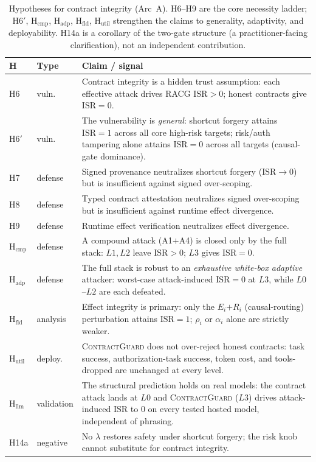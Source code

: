 \documentclass[conference,onecolumn]{IEEEtran}
\theoremstyle{definition}
\newcommand{\racg}{\textsc{RACG}}
\newcommand{\cg}{\textsc{ContractGuard}}
\newcommand{\isr}{\mathrm{ISR}}
\begin{document}
\begin{table}[t]
\centering
\caption{Hypotheses for contract integrity (Arc~A). H6--H9 are the core necessity
ladder; H6$'$, H$_\text{cmp}$, H$_\text{adp}$, H$_\text{fld}$, H$_\text{util}$
strengthen the claims to generality, adaptivity, and deployability. H14a is a
corollary of the two-gate structure (a practitioner-facing clarification), not an
independent contribution.}
\label{tab:hyp}
\small
\begin{tabularx}{\columnwidth}{@{}l l Y@{}}
\toprule
\textbf{H} & \textbf{Type} & \textbf{Claim / signal} \\
\midrule
H6 & vuln.\ & Contract integrity is a hidden trust assumption: each effective
attack drives \racg{} $\isr>0$; honest contracts give $\isr=0$. \\
H6$'$ & vuln.\ & The vulnerability is \emph{general}: shortcut forgery attains
$\isr=1$ across all core high-risk targets; risk/auth tampering alone attains
$\isr=0$ across all targets (causal-gate dominance). \\
H7 & defense & Signed provenance neutralizes shortcut forgery ($\isr\!\to\!0$)
but is insufficient against signed over-scoping. \\
H8 & defense & Typed contract attestation neutralizes signed over-scoping
but is insufficient against runtime effect divergence. \\
H9 & defense & Runtime effect verification neutralizes effect divergence. \\
H$_\text{cmp}$ & defense & A compound attack (A1$+$A4) is closed only by the full
stack: $L1,L2$ leave $\isr>0$; $L3$ gives $\isr=0$. \\
H$_\text{adp}$ & defense & The full stack is robust to an \emph{exhaustive
white-box adaptive} attacker: worst-case attack-induced $\isr=0$ at $L3$, while
$L0$--$L2$ are each defeated. \\
H$_\text{fld}$ & analysis & Effect integrity is primary: only the
$E_i$$+$$R_i$ (causal-routing) perturbation attains $\isr=1$; $\rho_i$ or
$\alpha_i$ alone are strictly weaker. \\
H$_\text{util}$ & deploy.\ & \cg{} does not over-reject honest contracts: task
success, authorization-task success, token cost, and tools-dropped are unchanged
at every level. \\
H$_\text{llm}$ & validation & The structural prediction holds on real models: the
contract attack lands at $L0$ and \cg{} ($L3$) drives attack-induced $\isr$ to
$0$ on every tested hosted model, independent of phrasing. \\
H14a & negative & No $\lambda$ restores safety under shortcut forgery; the risk
knob cannot substitute for contract integrity. \\
\bottomrule
\end{tabularx}
\end{table}
\end{document}
